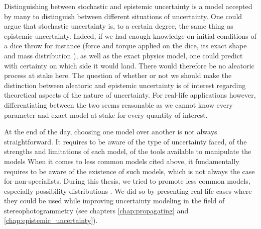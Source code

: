 \begin{remark}
    Distinguishing between stochastic and epistemic uncertainty is a model accepted by many to distinguish between different situations of uncertainty. One could argue that stochastic uncertainty is, to a certain degree, the same thing as epistemic uncertainty. Indeed, if we had enough knowledge on initial conditions of a dice throw for instance (force and torque applied on the dice, its exact shape and mass distribution \etc), as well as the exact physics model, one could predict with certainty on which side it would land. There would therefore be no aleatoric process at stake here. The question of whether or not we should make the distinction between aleatoric and epistemic uncertainty is of interest regarding theoretical aspects of the nature of uncertainty. For real-life applications however, differentiating between the two seems reasonable as we cannot know every parameter and exact model at stake for every quantity of interest. 
\end{remark}

At the end of the day, choosing one model over another is not always straightforward. It requires to be aware of the type of uncertainty faced, of the strengths and limitations of each model, of the tools available to manipulate the models \etc When it comes to less common models cited above, it fundamentally requires to be aware of the existence of such models, which is not always the case for non-specialists. During this thesis, we tried to promote less common models, especially possibility distributions . We did so by presenting real life cases where they could be used while improving uncertainty modeling in the field of stereophotogrammetry (see chapters \ref{chap:propagating} and \ref{chap:epistemic_uncertainty}). 

